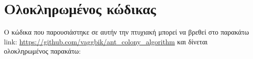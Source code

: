 \section*{Ολοκληρωμένος κώδικας}
Ο κώδικα που παρουσιάστηκε σε αυτήν την πτυχιακή μπορεί να βρεθεί στο παρακάτω link:
\url{https://github.com/vaggbik/ant_colony_algorithm}
και δίνεται ολοκληρωμένος παρακάτω: 


